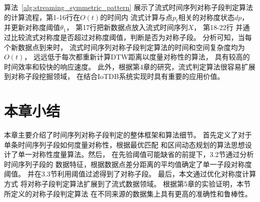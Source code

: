算法~\ref{alg:streaming_symmetric_pattern}
展示了流式时间序列对称子段判定算法
的计算流程，第1-16行在$O(t)$的时间内
流式计算与点$p_t$相关的对称度状态$dp$，
并更新对称度阈值$\theta_1$，
第17行把新数据点放入流式时间序列$X$，
第18-22行
并通过比较流式对称度是否超过对称度阈值，判断是否为对称子段。
分析可知，当每个新数据点到来时，
流式时间序列对称子段判定算法的时间和空间复杂度均为$O(t)$，
远远低于每次都重新计算DTW距离以度量对称性的算法，
具有较高的时间效率和较快的响应速度。
此外，根据第4章的研究，流式判定算法很容易扩展到对称子段挖掘领域，
在结合IoTDB系统实现时具有重要的应用价值。

\section{本章小结}
本章主要介绍了时间序列对称子段判定的整体框架和算法细节。
首先定义了对于单条时间序列子段如何度量对称性，根据最优匹配
和区间动态规划的算法思想设计了单一对称性度量算法。然后，
在先验阈值可能缺省的前提下，3.2节通过分析时间序列子段的
数据特征，根据数据点差分距离的平均值确定了单一子段对称度阈值。
并在3.3节利用阈值过滤得到了对称子段。
最后，本文通过优化对称度计算方式
将对称子段判定算法扩展到了流式数据领域。
根据第5章的实验证明，本节所定义的对称子段判定算法
在不同来源的数据集上具有更高的准确性和鲁棒性。